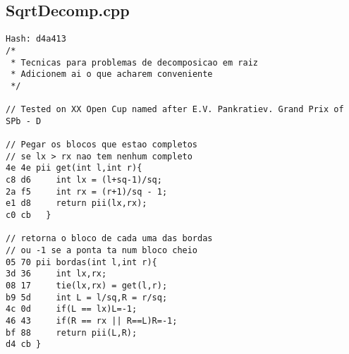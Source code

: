 \documentclass[11pt, a4paper, twoside]{article}
\begin{document}
\subsection{SqrtDecomp.cpp}
\begin{lstlisting}
Hash: d4a413
/* 
 * Tecnicas para problemas de decomposicao em raiz
 * Adicionem ai o que acharem conveniente
 */

// Tested on XX Open Cup named after E.V. Pankratiev. Grand Prix of SPb - D

// Pegar os blocos que estao completos
// se lx > rx nao tem nenhum completo
4e 4e pii get(int l,int r){
c8 d6     int lx = (l+sq-1)/sq;
2a f5     int rx = (r+1)/sq - 1;
e1 d8     return pii(lx,rx);
c0 cb   }

// retorna o bloco de cada uma das bordas
// ou -1 se a ponta ta num bloco cheio
05 70 pii bordas(int l,int r){
3d 36     int lx,rx;
08 17     tie(lx,rx) = get(l,r);
b9 5d     int L = l/sq,R = r/sq;
4c 0d     if(L == lx)L=-1;
46 43     if(R == rx || R==L)R=-1;
bf 88     return pii(L,R);
d4 cb }
\end{lstlisting}
\end{document}
